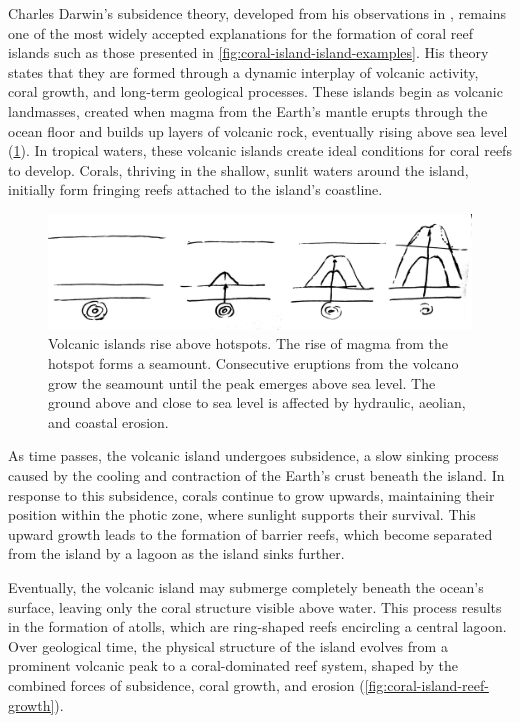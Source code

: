 Charles Darwin's subsidence theory, developed from his observations in \citep{Darwin1842}, remains one of the most widely accepted explanations for the formation of coral reef islands such as those presented in \cref{fig:coral-island-island-examples}. His theory states that they are formed through a dynamic interplay of volcanic activity, coral growth, and long-term geological processes. These islands begin as volcanic landmasses, created when magma from the Earth's mantle erupts through the ocean floor and builds up layers of volcanic rock, eventually rising above sea level (\cref{fig:coral-island-island-growth}). In tropical waters, these volcanic islands create ideal conditions for coral reefs to develop. Corals, thriving in the shallow, sunlit waters around the island, initially form fringing reefs attached to the island's coastline.

\begin{figure}[H]
    \centering
    \includegraphics[width = \linewidth]{other_images/Drawings/Volcano.jpg}
    \caption{Volcanic islands rise above hotspots. The rise of magma from the hotspot forms a seamount. Consecutive eruptions from the volcano grow the seamount until the peak emerges above sea level. The ground above and close to sea level is affected by hydraulic, aeolian, and coastal erosion.}
    \label{fig:coral-island-island-growth}
\end{figure}

As time passes, the volcanic island undergoes subsidence, a slow sinking process caused by the cooling and contraction of the Earth's crust beneath the island. In response to this subsidence, corals continue to grow upwards, maintaining their position within the photic zone, where sunlight supports their survival. This upward growth leads to the formation of barrier reefs, which become separated from the island by a lagoon as the island sinks further.

Eventually, the volcanic island may submerge completely beneath the ocean's surface, leaving only the coral structure visible above water. This process results in the formation of atolls, which are ring-shaped reefs encircling a central lagoon. Over geological time, the physical structure of the island evolves from a prominent volcanic peak to a coral-dominated reef system, shaped by the combined forces of subsidence, coral growth, and erosion (\cref{fig:coral-island-reef-growth}).

